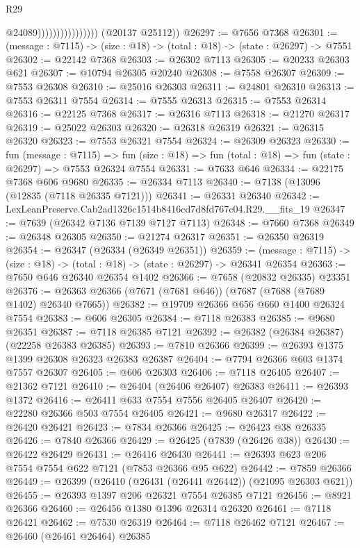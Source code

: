 \begin{lexlean}{R29}
\begin{coremodule}
                                      @24089))))))))))))))))
      (@20137 @25112))
@26297 := @7656 @7368
@26301 := (message : @7115) -> (size : @18) -> (total : @18) -> (state : @26297) -> @7551
@26302 := @22142 @7368
@26303 := @26302 @7113
@26305 := @20233 @26303 @621
@26307 := @10794 @26305 @20240
@26308 := @7558 @26307
@26309 := @7553 @26308
@26310 := @25016 @26303
@26311 := @24801 @26310
@26313 := @7553 @26311 @7554
@26314 := @7555 @26313
@26315 := @7553 @26314
@26316 := @22125 @7368
@26317 := @26316 @7113
@26318 := @21270 @26317
@26319 := @25022 @26303
@26320 := @26318 @26319
@26321 := @26315 @26320
@26323 := @7553 @26321 @7554
@26324 := @26309 @26323
@26330 := fun (message : @7115) =>
  fun (size : @18) => fun (total : @18) => fun (state : @26297) => @7553 @26324 @7554
@26331 := @7633 @646
@26334 := @22175 @7368 @606 @9680
@26335 := @26334 @7113
@26340 := @7138 (@13096 (@12835 (@7118 @26335 @7121)))
@26341 := @26331 @26340
@26342 := LexLeanPreserve.Cab2ad1326c1514b8416cd7d8fd767c04.R29.__fits_19
@26347 := @7639 (@26342 @7136 @7139 @7127 @7113)
@26348 := @7660 @7368
@26349 := @26348 @26305
@26350 := @21274 @26317
@26351 := @26350 @26319
@26354 := @26347 (@26334 (@26349 @26351))
@26359 := (message : @7115) -> (size : @18) -> (total : @18) -> (state : @26297) -> @26341 @26354
@26363 := @7650 @646 @26340 @26354 @1402
@26366 := @7658 (@20832 @26335) @23351
@26376 := @26363 @26366 (@7671 (@7681 @646)) (@7687 (@7688 (@7689 @1402) @26340 @7665))
@26382 := @19709 @26366 @656 @660 @1400 @26324 @7554
@26383 := @606 @26305
@26384 := @7118 @26383
@26385 := @9680 @26351
@26387 := @7118 @26385 @7121
@26392 := @26382 (@26384 @26387) (@22258 @26383 @26385)
@26393 := @7810 @26366
@26399 := @26393 @1375 @1399 @26308 @26323 @26383 @26387
@26404 := @7794 @26366 @603 @1374 @7557 @26307
@26405 := @606 @26303
@26406 := @7118 @26405
@26407 := @21362 @7121
@26410 := @26404 (@26406 @26407) @26383
@26411 := @26393 @1372
@26416 := @26411 @633 @7554 @7556 @26405 @26407
@26420 := @22280 @26366 @503 @7554 @26405
@26421 := @9680 @26317
@26422 := @26420 @26421
@26423 := @7834 @26366
@26425 := @26423 @38 @26335
@26426 := @7840 @26366
@26429 := @26425 (@7839 (@26426 @38))
@26430 := @26422 @26429
@26431 := @26416 @26430
@26441 := @26393 @623 @206 @7554 @7554 @622 @7121 (@7853 @26366 @95 @622)
@26442 := @7859 @26366
@26449 := @26399 (@26410 (@26431 (@26441 @26442)) (@21095 @26303 @621))
@26455 := @26393 @1397 @206 @26321 @7554 @26385 @7121
@26456 := @8921 @26366
@26460 := @26456 @1380 @1396 @26314 @26320
@26461 := @7118 @26421
@26462 := @7530 @26319
@26464 := @7118 @26462 @7121
@26467 := @26460 (@26461 @26464) @26385

\end{coremodule}
\end{lexlean}
